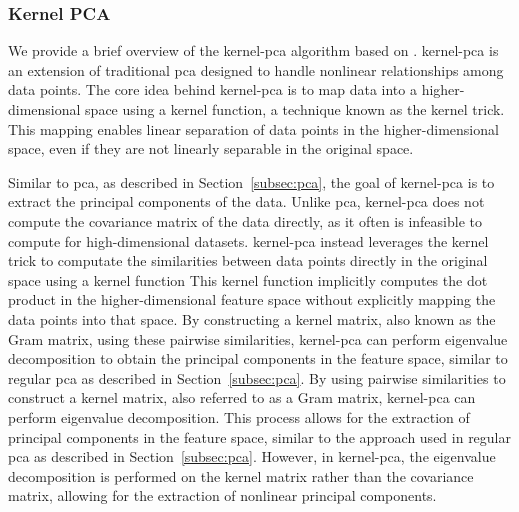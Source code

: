 \subsubsection{Kernel PCA}
We provide a brief overview of the \gls{kernel-pca} algorithm based on \citet{learningwithkernels}.
\gls{kernel-pca} is an extension of traditional \gls{pca} designed to handle nonlinear relationships among data points.
The core idea behind \gls{kernel-pca} is to map data into a higher-dimensional space using a kernel function, a technique known as the kernel trick.
This mapping enables linear separation of data points in the higher-dimensional space, even if they are not linearly separable in the original space.

Similar to \gls{pca}, as described in Section~\ref{subsec:pca}, the goal of \gls{kernel-pca} is to extract the principal components of the data.
Unlike \gls{pca}, \gls{kernel-pca} does not compute the covariance matrix of the data directly, as it often is infeasible to compute for high-dimensional datasets.
\gls{kernel-pca} instead leverages the kernel trick to computate the similarities between data points directly in the original space using a kernel function
This kernel function implicitly computes the dot product in the higher-dimensional feature space without explicitly mapping the data points into that space.
By constructing a kernel matrix, also known as the Gram matrix, using these pairwise similarities, \gls{kernel-pca} can perform eigenvalue decomposition to obtain the principal components in the feature space, similar to regular \gls{pca} as described in Section~\ref{subsec:pca}.
By using pairwise similarities to construct a kernel matrix, also referred to as a Gram matrix, \gls{kernel-pca} can perform eigenvalue decomposition.
This process allows for the extraction of principal components in the feature space, similar to the approach used in regular \gls{pca} as described in Section~\ref{subsec:pca}.
However, in \gls{kernel-pca}, the eigenvalue decomposition is performed on the kernel matrix rather than the covariance matrix, allowing for the extraction of nonlinear principal components.